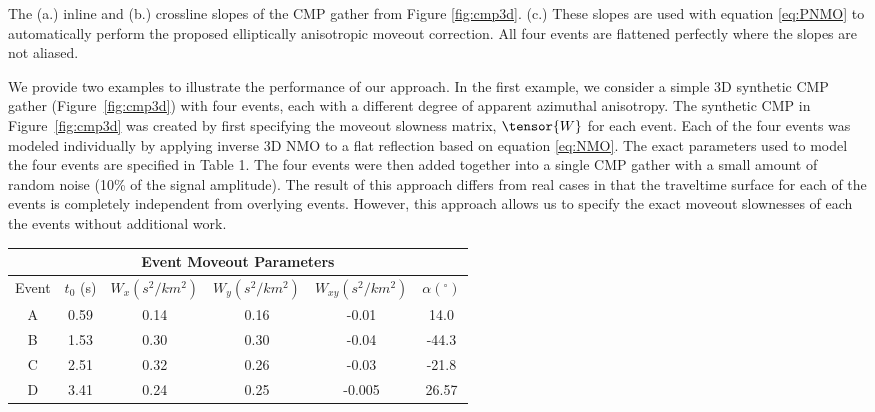  {The (a.) inline and (b.) crossline slopes of the CMP gather from Figure \ref{fig:cmp3d}.  (c.) These slopes are used with equation \ref{eq:PNMO} to automatically perform the proposed elliptically anisotropic moveout correction. All four events are flattened perfectly where the slopes are not aliased.}

We provide two examples to illustrate the performance of our approach.  In the first example, we consider a simple 3D synthetic CMP gather (Figure~\ref{fig:cmp3d}) with four events, each with a different degree of apparent azimuthal anisotropy. The synthetic CMP in Figure~\ref{fig:cmp3d} was created by first specifying the moveout slowness matrix, $\tensor{W}$ for each event.  Each of the four events was modeled individually by applying inverse 3D NMO to a flat reflection based on equation \ref{eq:NMO}.  The exact parameters used to model the four events are specified in Table 1.  The four events were then added together into a single CMP gather with a small amount of random noise (10\% of the signal amplitude).  The result of this approach differs from real cases in that the traveltime surface for each of the events is completely independent from overlying events.  However, this approach allows us to specify the exact moveout slownesses of each the events without additional work.  

 {
    \begin{center}
     \begin{tabular}{|c|c|c|c|c|c|}
      \hline \multicolumn{6}{|c|}{Event Moveout Parameters} \\ 
      \hline Event & $t_0$ (s) &  $W_x (s^2/km^2)$ & $W_y (s^2/km^2)$ & $W_{xy} (s^2/km^2)$ & $\alpha (^\circ )$ \\ 
      \hline A  & 0.59 & 0.14 & 0.16 & -0.01 & 14.0 \\ 
      \hline B  & 1.53 & 0.30 & 0.30 & -0.04 & -44.3 \\  
      \hline C  & 2.51 & 0.32 & 0.26 & -0.03 & -21.8 \\ 
      \hline D  & 3.41 & 0.24 & 0.25 & -0.005 & 26.57 \\ 
      \hline
    \end{tabular} 
   \end{center}
} 

